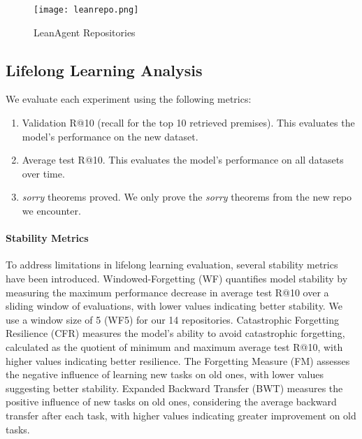 \documentclass{article} %
\begin{document}
\begin{figure}
        \centering
        \texttt{[image: leanrepo.png]}
        \caption{LeanAgent Repositories}
        \label{fig:repos}
    \end{figure}


\subsection{Lifelong Learning Analysis}

We evaluate each experiment using the following metrics:
\begin{enumerate}
    \item Validation R@10 (recall for the top 10 retrieved premises). This evaluates the model's performance on the new dataset.
    \item Average test R@10. This evaluates the model's performance on all datasets over time. 
    \item \textit{sorry} theorems proved. We only prove the \textit{sorry} theorems from the new repo we encounter.
\end{enumerate}

\paragraph{Stability Metrics}
To address limitations in lifelong learning evaluation, several stability metrics have been introduced. Windowed-Forgetting (WF) quantifies model stability by measuring the maximum performance decrease in average test R@10 over a sliding window of evaluations, with lower values indicating better stability. We use a window size of 5 (WF5) for our 14 repositories. Catastrophic Forgetting Resilience (CFR) measures the model's ability to avoid catastrophic forgetting, calculated as the quotient of minimum and maximum average test R@10, with higher values indicating better resilience. The Forgetting Measure (FM) assesses the negative influence of learning new tasks on old ones, with lower values suggesting better stability. Expanded Backward Transfer (BWT) measures the positive influence of new tasks on old ones, considering the average backward transfer after each task, with higher values indicating greater improvement on old tasks.
\end{document}
